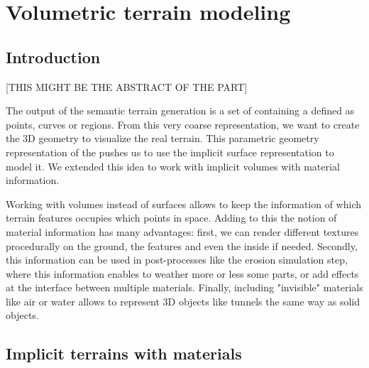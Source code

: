 \chapter{Volumetric terrain modeling}
\label{chap:volumic-modeling}
\minitoc

\section{Introduction}
[THIS MIGHT BE THE ABSTRACT OF THE PART]

The output of the semantic terrain generation is a set of  containing a  defined as points, curves or regions. From this very coarse representation, we want to create the 3D geometry to visualize the real terrain. This parametric geometry representation of the  pushes us to use the implicit surface representation to model it. We extended this idea to work with implicit volumes with material information.

Working with volumes instead of surfaces allows to keep the information of which terrain features occupies which points in space. Adding to this the notion of material information has many advantages: first, we can render different textures procedurally on the ground, the features and even the inside if needed. Secondly, this information can be used in post-processes like the erosion simulation step, where this information enables to weather more or less some parts, or add effects at the interface between multiple materials. Finally, including "invisible" materials like air or water allows to represent 3D objects like tunnels the same way as solid objects.


\section{Implicit terrains with materials}
\label{sec:volumic-modeling_implicit-terrain-with-materials}

